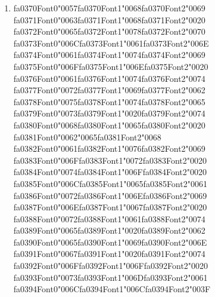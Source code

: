 \documentclass[12pt]{article}
\begin{document}
\begin{enumerate}[label=Q\arabic*.]
 \item {\csname fa0370Font0\endcsname\char"0057}{\csname fa0370Font1\endcsname\char"0068}{\csname fa0370Font2\endcsname\char"0069} {\csname fa0371Font0\endcsname\char"0063}{\csname fa0371Font1\endcsname\char"0068}{\csname fa0371Font2\endcsname\char"0020} {\csname fa0372Font0\endcsname\char"0065}{\csname fa0372Font1\endcsname\char"0078}{\csname fa0372Font2\endcsname\char"0070} {\csname fa0373Font0\endcsname\char"006C}{\csname fa0373Font1\endcsname\char"0061}{\csname fa0373Font2\endcsname\char"006E} {\csname fa0374Font0\endcsname\char"0061}{\csname fa0374Font1\endcsname\char"0074}{\csname fa0374Font2\endcsname\char"0069} {\csname fa0375Font0\endcsname\char"006F}{\csname fa0375Font1\endcsname\char"006E}{\csname fa0375Font2\endcsname\char"0020} {\csname fa0376Font0\endcsname\char"0061}{\csname fa0376Font1\endcsname\char"0074}{\csname fa0376Font2\endcsname\char"0074} {\csname fa0377Font0\endcsname\char"0072}{\csname fa0377Font1\endcsname\char"0069}{\csname fa0377Font2\endcsname\char"0062} {\csname fa0378Font0\endcsname\char"0075}{\csname fa0378Font1\endcsname\char"0074}{\csname fa0378Font2\endcsname\char"0065} {\csname fa0379Font0\endcsname\char"0073}{\csname fa0379Font1\endcsname\char"0020}{\csname fa0379Font2\endcsname\char"0074} {\csname fa0380Font0\endcsname\char"0068}{\csname fa0380Font1\endcsname\char"0065}{\csname fa0380Font2\endcsname\char"0020} {\csname fa0381Font0\endcsname\char"0062}{\char"0065}{\csname fa0381Font2\endcsname\char"0068} {\csname fa0382Font0\endcsname\char"0061}{\csname fa0382Font1\endcsname\char"0076}{\csname fa0382Font2\endcsname\char"0069} {\csname fa0383Font0\endcsname\char"006F}{\csname fa0383Font1\endcsname\char"0072}{\csname fa0383Font2\endcsname\char"0020} {\csname fa0384Font0\endcsname\char"0074}{\csname fa0384Font1\endcsname\char"006F}{\csname fa0384Font2\endcsname\char"0020} {\csname fa0385Font0\endcsname\char"006C}{\csname fa0385Font1\endcsname\char"0065}{\csname fa0385Font2\endcsname\char"0061} {\csname fa0386Font0\endcsname\char"0072}{\csname fa0386Font1\endcsname\char"006E}{\csname fa0386Font2\endcsname\char"0069} {\csname fa0387Font0\endcsname\char"006E}{\csname fa0387Font1\endcsname\char"0067}{\csname fa0387Font2\endcsname\char"0020} {\csname fa0388Font0\endcsname\char"0072}{\csname fa0388Font1\endcsname\char"0061}{\csname fa0388Font2\endcsname\char"0074} {\csname fa0389Font0\endcsname\char"0065}{\csname fa0389Font1\endcsname\char"0020}{\csname fa0389Font2\endcsname\char"0062} {\csname fa0390Font0\endcsname\char"0065}{\csname fa0390Font1\endcsname\char"0069}{\csname fa0390Font2\endcsname\char"006E} {\csname fa0391Font0\endcsname\char"0067}{\csname fa0391Font1\endcsname\char"0020}{\csname fa0391Font2\endcsname\char"0074} {\csname fa0392Font0\endcsname\char"006F}{\csname fa0392Font1\endcsname\char"006F}{\csname fa0392Font2\endcsname\char"0020} {\csname fa0393Font0\endcsname\char"0073}{\csname fa0393Font1\endcsname\char"006D}{\csname fa0393Font2\endcsname\char"0061} {\csname fa0394Font0\endcsname\char"006C}{\csname fa0394Font1\endcsname\char"006C}{\csname fa0394Font2\endcsname\char"003F}

\end{enumerate}
\end{document}
